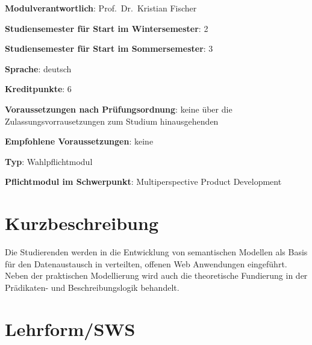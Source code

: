 \begin{modulHead}
\textbf{Modulverantwortlich}: Prof.~Dr.~Kristian
Fischer
\end{modulHead}
\begin{modulHead}
\textbf{Studiensemester für
Start im Wintersemester}:
2
\end{modulHead}
\begin{modulHead}
\textbf{Studiensemester für Start
im Sommersemester}:
3
\end{modulHead}
\begin{modulHead}
\textbf{Sprache}:
deutsch
\end{modulHead}
\begin{modulHead}
\textbf{Kreditpunkte}:
6
\end{modulHead}
\begin{modulHead}
\textbf{Voraussetzungen nach
Prüfungsordnung}: keine über die Zulassungsvorrausetzungen zum Studium
hinausgehenden
\end{modulHead}
\begin{modulHead}
\textbf{Empfohlene
Voraussetzungen}: keine
\end{modulHead}
\begin{modulHead}
\textbf{Typ}:
Wahlpflichtmodul
\end{modulHead}
\begin{modulHead}
\textbf{Pflichtmodul
im Schwerpunkt}: Multiperspective Product Development
\end{modulHead}


\section*{Kurzbeschreibung\label{/mi-2017/modulbeschreibungen-master/MA_WTW_Modul_Logik-und-semantische-Modellierung}}\label{kurzbeschreibungpathlabelmi-2017modulbeschreibungen-mastermaux5fwtwux5fmodulux5flogik-und-semantische-modellierung}

Die Studierenden werden in die Entwicklung von semantischen Modellen als
Basis für den Datenaustausch in verteilten, offenen Web Anwendungen
eingeführt. Neben der praktischen Modellierung wird auch die
theoretische Fundierung in der Prädikaten- und Beschreibungslogik
behandelt.

\section*{Lehrform/SWS
\label{/mi-2017/modulbeschreibungen-master/MA_WTW_Modul_Logik-und-semantische-Modellierung}}\label{lehrformsws-pathlabelmi-2017modulbeschreibungen-mastermaux5fwtwux5fmodulux5flogik-und-semantische-modellierung}

